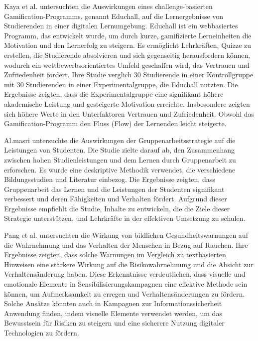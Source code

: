 \documentclass[german,report]{i1thesis}
\begin{document}
Kaya et al. \cite{kaya2023impact} untersuchten die Auswirkungen eines challenge-basierten Gamification-Programms, genannt Educhall, auf die Lernergebnisse von Studierenden in einer digitalen Lernumgebung. Educhall ist ein webbasiertes Programm, das entwickelt wurde, um durch kurze, gamifizierte Lerneinheiten die Motivation und den Lernerfolg zu steigern. Es ermöglicht Lehrkräften, Quizze zu erstellen, die Studierende absolvieren und sich gegenseitig herausfordern können, wodurch ein wettbewerbsorientiertes Umfeld geschaffen wird, das Vertrauen und Zufriedenheit fördert. Ihre Studie verglich 30 Studierende in einer Kontrollgruppe mit 30 Studierenden in einer Experimentalgruppe, die Educhall nutzten. Die Ergebnisse zeigten, dass die Experimentalgruppe eine signifikant höhere akademische Leistung und gesteigerte Motivation erreichte. Insbesondere zeigten sich höhere Werte in den Unterfaktoren Vertrauen und Zufriedenheit. Obwohl das Gamification-Programm den Fluss (Flow) der Lernenden leicht steigerte.

Al.masri \cite {almasri2018groupwork} untersuchte die Auswirkungen der Gruppenarbeitsstrategie auf die Leistungen von Studenten. Die Studie zielte darauf ab, den Zusammenhang zwischen hohen Studienleistungen und dem Lernen durch Gruppenarbeit zu erforschen. Es wurde eine deskriptive Methodik verwendet, die verschiedene Bildungsstudien und Literatur einbezog. Die Ergebnisse zeigten, dass Gruppenarbeit das Lernen und die Leistungen der Studenten signifikant verbessert und deren Fähigkeiten und Verhalten fördert. Aufgrund dieser Ergebnisse empfiehlt die Studie, Inhalte zu entwickeln, die die Ziele dieser Strategie unterstützen, und Lehrkräfte in der effektiven Umsetzung zu schulen.

Pang et al. \cite{pang2021graphicwarnings} untersuchten die Wirkung von bildlichen Gesundheitswarnungen auf die Wahrnehmung und das Verhalten der Menschen in Bezug auf Rauchen. Ihre Ergebnisse zeigten, dass solche Warnungen im Vergleich zu textbasierten Hinweisen eine stärkere Wirkung auf die Risikowahrnehmung und die Absicht zur Verhaltensänderung haben. Diese Erkenntnisse verdeutlichen, dass visuelle und emotionale Elemente in Sensibilisierungskampagnen eine effektive Methode sein können, um Aufmerksamkeit zu erregen und Verhaltensänderungen zu fördern. Solche Ansätze könnten auch in Kampagnen zur Informationssicherheit Anwendung finden, indem visuelle Elemente verwendet werden, um das Bewusstsein für Risiken zu steigern und eine sicherere Nutzung digitaler Technologien zu fördern.
\end{document}

